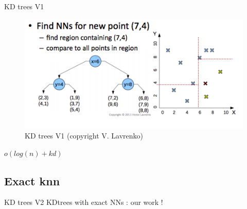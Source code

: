 \documentclass[11 pt]{beamer}
\begin{document}
\begin{frame}{KD trees V1}
\begin{figure}
	\centering
	\includegraphics[width=\textwidth]{figures/lavrenko.png}
	\caption{KD trees V1 (copyright V. Lavrenko)}
	\label{fig:lsh}
\end{figure}
$o(log(n)+kd)$
\end{frame}
%
\subsection{Exact knn}

\begin{frame}{KD trees V2}
\Large{\textrightarrow KDtrees with exact NNs : our work !}
\end{frame}
\end{document}
